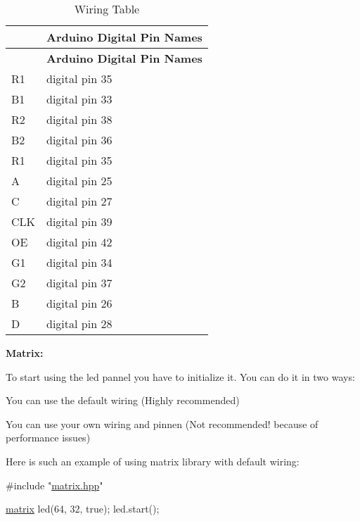 \hypertarget{index_multi_row}{}
\tabulinesep=1mm
\begin{longtabu} spread 0pt [c]{*2{|X[-1]}|}
\caption{Wiring Table}\label{index_multi_row}\\
\hline
{}&{\bf Arduino Digital Pin Names }\\
\endfirsthead
\hline
\endfoot
\hline
{}&{\bf Arduino Digital Pin Names }\\
\endhead
R1&digital pin 35 \\
B1&digital pin 33 \\
R2&digital pin 38 \\
B2&digital pin 36 \\
R1&digital pin 35 \\
A&digital pin 25 \\
C&digital pin 27 \\
C\+LK&digital pin 39 \\
OE&digital pin 42 \\
G1&digital pin 34 \\
G2&digital pin 37 \\
B&digital pin 26 \\
D&digital pin 28 \\
\end{longtabu}


{\bfseries Matrix\+:} 

To start using the led pannel you have to initialize it. You can do it in two ways\+:
\begin{DoxyItemize}
\item You can use the default wiring (Highly recommended)
\item You can use your own wiring and pinnen (Not recommended! because of performance issues)
\end{DoxyItemize}

Here is such an example of using matrix library with default wiring\+: 
\begin{DoxyCode}
\textcolor{preprocessor}{#include "\hyperlink{matrix_8hpp}{matrix.hpp}"}

\hyperlink{classmatrix}{matrix} led(64, 32, \textcolor{keyword}{true});
led.start();
\end{DoxyCode}


